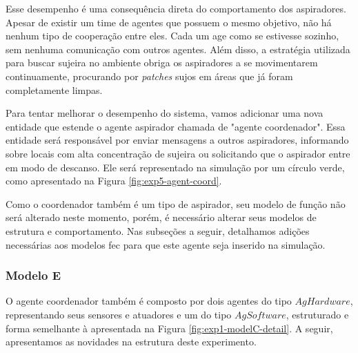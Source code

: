 Esse desempenho é uma consequência direta do comportamento dos aspiradores. Apesar de existir um time de agentes que possuem o mesmo objetivo, não há nenhum tipo de cooperação entre eles. Cada um age como se estivesse sozinho, sem nenhuma comunicação com outros agentes. Além disso, a estratégia utilizada para buscar sujeira no ambiente obriga os aspiradores a se movimentarem continuamente, procurando por \textit{patches} sujos em áreas que já foram completamente limpas. 

Para tentar melhorar o desempenho do sistema, vamos adicionar uma nova entidade que estende o agente aspirador chamada de "agente coordenador". Essa entidade será responsável por enviar mensagens a outros aspiradores, informando sobre locais com alta concentração de sujeira ou solicitando que o aspirador entre em modo de descanso. Ele será representado na simulação por um círculo verde, como apresentado na Figura \ref{fig:exp5-agent-coord}.

\begin{figure}[h!]
    \centering
\end{figure}

Como o coordenador também é um tipo de aspirador, seu modelo de função não será alterado neste momento, porém, é necessário alterar seus modelos de estrutura e comportamento. Nas subseções a seguir, detalhamos adições necessárias aos modelos \acrshort{fec} para que este agente seja inserido na simulação.  

\subsubsection{Modelo E}

O agente coordenador também é composto por dois agentes do tipo $AgHardware$, representando seus sensores e atuadores e um do tipo $AgSoftware$, estruturado e forma semelhante à apresentada na Figura \ref{fig:exp1-modelC-detail}. A seguir, apresentamos as novidades na estrutura deste experimento. 

